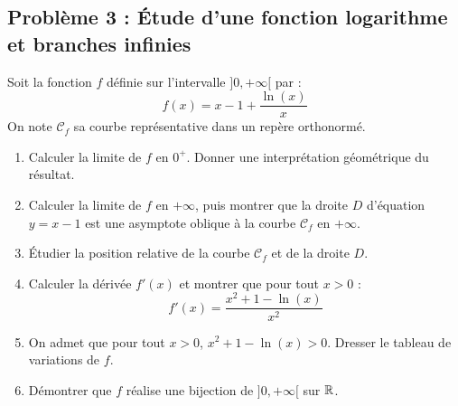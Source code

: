\subsection*{Problème 3 : Étude d'une fonction logarithme et branches infinies}
Soit la fonction $f$ définie sur l'intervalle $]0, +\infty[$ par :
\[
f(x) = x - 1 + \frac{\ln(x)}{x}
\]
On note $\mathcal{C}_f$ sa courbe représentative dans un repère orthonormé.
\begin{enumerate}
    \item Calculer la limite de $f$ en $0^+$. Donner une interprétation géométrique du résultat.
    \item Calculer la limite de $f$ en $+\infty$, puis montrer que la droite $D$ d'équation $y = x - 1$ est une asymptote oblique à la courbe $\mathcal{C}_f$ en $+\infty$.
    \item Étudier la position relative de la courbe $\mathcal{C}_f$ et de la droite $D$.
    \item Calculer la dérivée $f'(x)$ et montrer que pour tout $x > 0$ :
    \[
    f'(x) = \frac{x^2 + 1 - \ln(x)}{x^2}
    \]
    \item On admet que pour tout $x > 0$, $x^2 + 1 - \ln(x) > 0$. Dresser le tableau de variations de $f$.
    \item Démontrer que $f$ réalise une bijection de $]0, +\infty[$ sur $\mathbb{R}$.
\end{enumerate}


